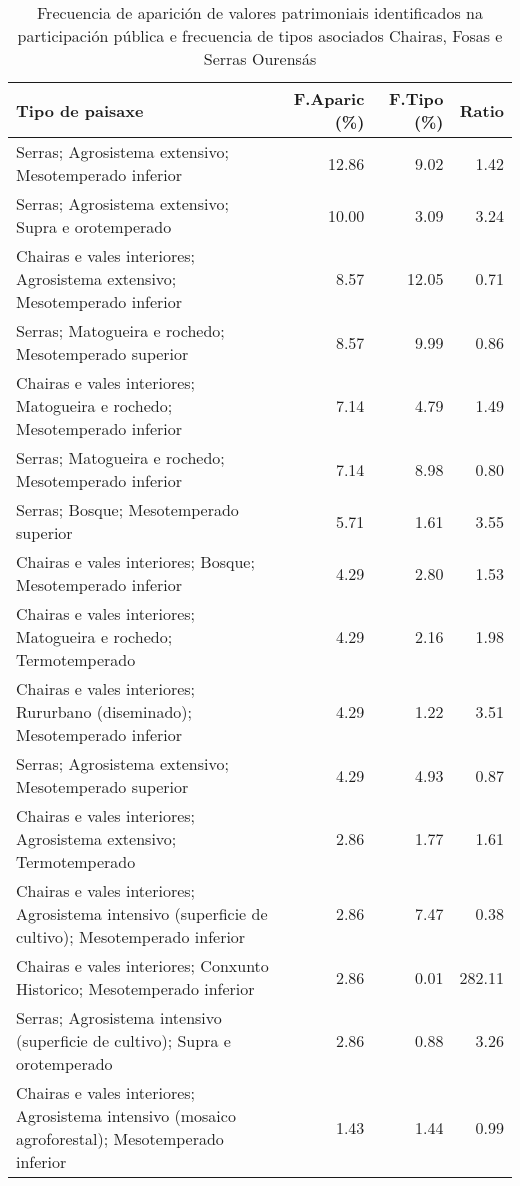 \begin{table}[p]
\centering
\caption{Frecuencia de aparición de valores patrimoniais identificados na participación pública e frecuencia de tipos asociados Chairas, Fosas e Serras Ourensás} 
\label{vsixotpat8}
\begin{tabular}{lrrr}
  \hline
Tipo de paisaxe & F.Aparic (\%) & F.Tipo (\%) & Ratio \\ 
  \hline
Serras; Agrosistema extensivo; Mesotemperado inferior & 12.86 & 9.02 & 1.42 \\ 
  Serras; Agrosistema extensivo; Supra e orotemperado & 10.00 & 3.09 & 3.24 \\ 
  Chairas e vales interiores; Agrosistema extensivo; Mesotemperado inferior & 8.57 & 12.05 & 0.71 \\ 
  Serras; Matogueira e rochedo; Mesotemperado superior & 8.57 & 9.99 & 0.86 \\ 
  Chairas e vales interiores; Matogueira e rochedo; Mesotemperado inferior & 7.14 & 4.79 & 1.49 \\ 
  Serras; Matogueira e rochedo; Mesotemperado inferior & 7.14 & 8.98 & 0.80 \\ 
  Serras; Bosque; Mesotemperado superior & 5.71 & 1.61 & 3.55 \\ 
  Chairas e vales interiores; Bosque; Mesotemperado inferior & 4.29 & 2.80 & 1.53 \\ 
  Chairas e vales interiores; Matogueira e rochedo; Termotemperado & 4.29 & 2.16 & 1.98 \\ 
  Chairas e vales interiores; Rururbano (diseminado); Mesotemperado inferior & 4.29 & 1.22 & 3.51 \\ 
  Serras; Agrosistema extensivo; Mesotemperado superior & 4.29 & 4.93 & 0.87 \\ 
  Chairas e vales interiores; Agrosistema extensivo; Termotemperado & 2.86 & 1.77 & 1.61 \\ 
  Chairas e vales interiores; Agrosistema intensivo (superficie de cultivo); Mesotemperado inferior & 2.86 & 7.47 & 0.38 \\ 
  Chairas e vales interiores; Conxunto Historico; Mesotemperado inferior & 2.86 & 0.01 & 282.11 \\ 
  Serras; Agrosistema intensivo (superficie de cultivo); Supra e orotemperado & 2.86 & 0.88 & 3.26 \\ 
  Chairas e vales interiores; Agrosistema intensivo (mosaico agroforestal); Mesotemperado inferior & 1.43 & 1.44 & 0.99 \\ 

\end{tabular}
\end{table}
